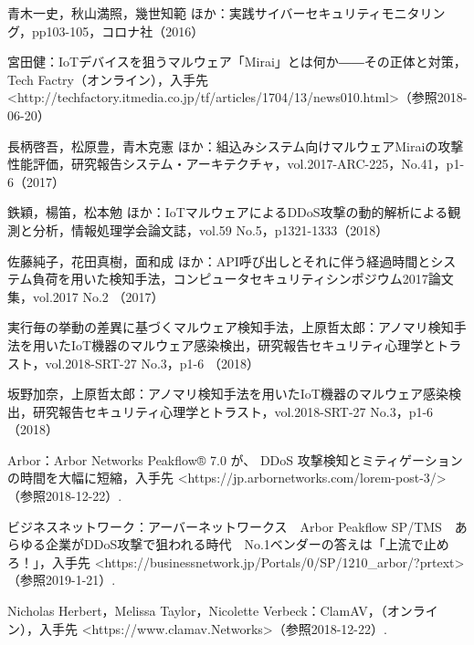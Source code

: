 \begin{thebibliography}{30}
        青木一史，秋山満照，幾世知範 ほか：実践サイバーセキュリティモニタリング，pp103-105，コロナ社（2016）
    
        宮田健：IoTデバイスを狙うマルウェア「Mirai」とは何か――その正体と対策，Tech Factry（オンライン），入手先\textless http:\slash\slash{}techfactory.itmedia.co.jp\slash{}tf\slash{}articles\slash{}1704\slash{}13\slash{}news010.html\textgreater（参照2018-06-20）
        
    
        長柄啓吾，松原豊，青木克憲 ほか：組込みシステム向けマルウェアMiraiの攻撃性能評価，研究報告システム・アーキテクチャ，vol.2017-ARC-225，No.41，p1-6（2017）
    
        鉄穎，楊笛，松本勉 ほか：IoTマルウェアによるDDoS攻撃の動的解析による観測と分析，情報処理学会論文誌，vol.59 No.5，p1321-1333（2018）

        佐藤純子，花田真樹，面和成 ほか：API呼び出しとそれに伴う経過時間とシステム負荷を用いた検知手法，コンピュータセキュリティシンポジウム2017論文集，vol.2017 No.2 （2017）

        実行毎の挙動の差異に基づくマルウェア検知手法，上原哲太郎：アノマリ検知手法を用いたIoT機器のマルウェア感染検出，研究報告セキュリティ心理学とトラスト，vol.2018-SRT-27 No.3，p1-6 （2018）

        坂野加奈，上原哲太郎：アノマリ検知手法を用いたIoT機器のマルウェア感染検出，研究報告セキュリティ心理学とトラスト，vol.2018-SRT-27 No.3，p1-6 （2018）

         Arbor：Arbor Networks Peakflow® 7.0 が、 DDoS 攻撃検知とミティゲーションの時間を大幅に短縮，入手先 \textless https:\slash\slash{}jp.arbornetworks.com\slash{}lorem-post-3\slash{}\textgreater （参照2018-12-22）.
    
         ビジネスネットワーク：アーバーネットワークス　Arbor Peakflow SP/TMS　あらゆる企業がDDoS攻撃で狙われる時代　No.1ベンダーの答えは「上流で止めろ！」，入手先 \textless https:\slash\slash{}businessnetwork.jp\slash{}Portals\slash{}0\slash{}SP\slash{}1210\_arbor\slash{}?prtext\textgreater （参照2019-1-21）.

         Nicholas Herbert，Melissa Taylor，Nicolette Verbeck：ClamAV，（オンライン），入手先 \textless https:\slash\slash{}www.clamav.Networks\textgreater（参照2018-12-22）.
    

\end{thebibliography}
